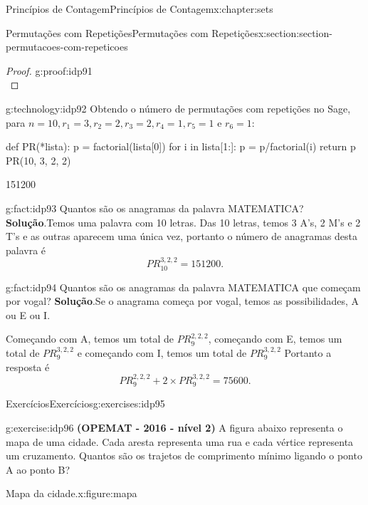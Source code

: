 \documentclass[oneside,10pt,]{book}
\newcommand{\blocktitlefont}{\relax}
\newcommand{\terminology}[1]{\textbf{#1}}
\numberwithin{equation}{section}
\begin{document}
\begin{chapterptx}{Princípios de Contagem}{}{Princípios de Contagem}{}{}{x:chapter:sets}
\begin{sectionptx}{Permutações com Repetições}{}{Permutações com Repetições}{}{}{x:section:section-permutacoes-com-repeticoes}
\begin{proof}{}{g:proof:idp91}
\begin{equation*}
\end{equation*}
\end{proof}
\begin{technology}{}{g:technology:idp92}%
Obtendo o número de permutações com repetições no Sage, para \(n=10, r_1 = 3, r_2=2, r_3=2, r_4=1, r_5=1\) e \(r_6=1\): \begin{sageinput}
def PR(*lista):
    p = factorial(lista[0])
    for i in lista[1:]:
        p = p/factorial(i)
    return p
PR(10, 3, 2, 2)
\end{sageinput}
\begin{sageoutput}
151200
\end{sageoutput}
\end{technology}
\begin{fact}{}{}{g:fact:idp93}%
Quantos são os anagramas da palavra MATEMATICA?%
\textbf{\blocktitlefont Solução}.\quad{}Temos uma palavra com 10 letras. Das 10 letras, temos 3 A's, 2 M's e 2 T's e as outras aparecem uma única vez, portanto o número de anagramas desta palavra é%
\begin{equation*}
PR_{10}^{3, 2, 2} = 151200. 
\end{equation*}
%
\end{fact}
\begin{fact}{}{}{g:fact:idp94}%
Quantos são os anagramas da palavra MATEMATICA que começam por vogal?%
\textbf{\blocktitlefont Solução}.\quad{}Se o anagrama começa por vogal, temos as possibilidades, A ou E ou I.%
\par
Começando com A, temos um total de \(PR_9^{2, 2, 2}\), começando com E, temos um total de \(PR_9^{3, 2, 2}\) e começando com I, temos um total de \(PR_9^{3, 2, 2}\) Portanto a resposta é%
\begin{equation*}
PR_9^{2, 2, 2} + 2\times PR_9^{3, 2, 2} = 75600. 
\end{equation*}
%
\end{fact}
%
%
\typeout{************************************************}
\typeout{************************************************}
%
\begin{exercises-subsection}{Exercícios}{}{Exercícios}{}{}{g:exercises:idp95}
\begin{divisionexercise}{1}{}{}{g:exercise:idp96}%
\terminology{(OPEMAT - 2016 - nível 2)} A figura abaixo representa o mapa de uma cidade. Cada aresta representa uma rua e cada vértice representa um cruzamento. Quantos são os trajetos de comprimento mínimo ligando o ponto A ao ponto B?%
\begin{figureptx}{Mapa da cidade.}{x:figure:mapa}{}%

\end{figureptx}
\end{divisionexercise}
\end{exercises-subsection}
\end{sectionptx}
\end{chapterptx}
\end{document}
